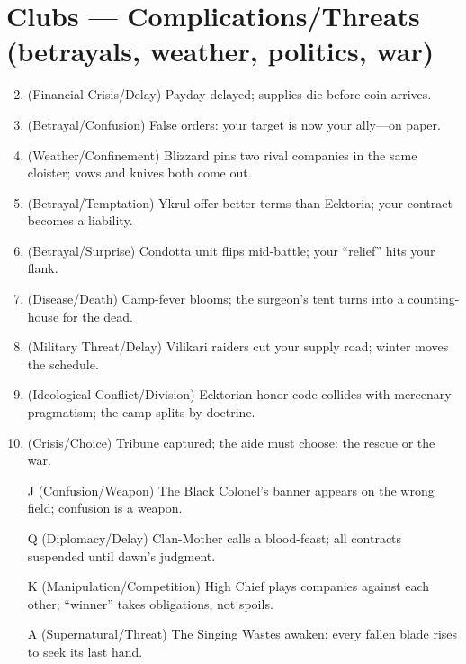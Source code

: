 \section*{Clubs --- Complications/Threats (betrayals, weather, politics, war)}
\label{sec:black-banners-complications}
\begin{enumerate}
\setcounter{enumi}{1}
\item (Financial Crisis/Delay) Payday delayed; supplies die before coin arrives.
\item (Betrayal/Confusion) False orders: your target is now your ally---on paper.
\item (Weather/Confinement) Blizzard pins two rival companies in the same cloister; vows and knives both come out.
\item (Betrayal/Temptation) Ykrul offer better terms than Ecktoria; your contract becomes a liability.
\item (Betrayal/Surprise) Condotta unit flips mid-battle; your ``relief'' hits your flank.
\item (Disease/Death) Camp-fever blooms; the surgeon's tent turns into a counting-house for the dead.
\item (Military Threat/Delay) Vilikari raiders cut your supply road; winter moves the schedule.
\item (Ideological Conflict/Division) Ecktorian honor code collides with mercenary pragmatism; the camp splits by doctrine.
\item (Crisis/Choice) Tribune captured; the aide must choose: the rescue or the war.
\item[J] (Confusion/Weapon) The Black Colonel's banner appears on the wrong field; confusion is a weapon.
\item[Q] (Diplomacy/Delay) Clan-Mother calls a blood-feast; all contracts suspended until dawn's judgment.
\item[K] (Manipulation/Competition) High Chief plays companies against each other; ``winner'' takes obligations, not spoils.
\item[A] (Supernatural/Threat) The Singing Wastes awaken; every fallen blade rises to seek its last hand.
\end{enumerate}

